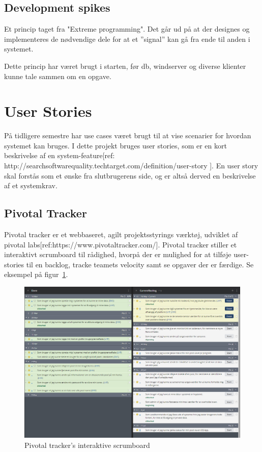 \subsection{Development spikes}
Et princip taget fra "Extreme programming". Det går ud på at der designes og implementeres de nødvendige dele for at et ''signal'' kan gå fra ende til anden i systemet.

Dette princip har været brugt i starten, før \gls{db}, \gls{windserver} og diverse klienter kunne tale sammen om en opgave.

\section{User Stories}
På tidligere semestre har use cases været brugt til at vise scenarier for hvordan systemet kan bruges. I dette projekt bruges user stories\cite{margaretrouse2015}, som er en kort beskrivelse af en system-feature[ref: http://searchsoftwarequality.techtarget.com/definition/user-story ]. En user story skal forstås som et ønske fra slutbrugerens side, og er altså derved en beskrivelse af et systemkrav.

\subsection{Pivotal Tracker}
Pivotal tracker er et webbaseret, agilt projektsstyrings værktøj, udviklet af pivotal labs[ref:https://www.pivotaltracker.com/]. Pivotal tracker stiller et interaktivt scrumboard til rådighed, hvorpå der er mulighed for at tilføje user-stories til en backlog, tracke teamets velocity samt se opgaver der er færdige. Se eksempel på figur~\ref{fig:scrumboard}.

\begin{figure}
	\centering
	\includegraphics[width=\linewidth]{figs/processProjektGennemforsel/scrumboard.PNG}
	\caption{Pivotal tracker's interaktive scrumboard}
	\label{fig:scrumboard}
\end{figure}

